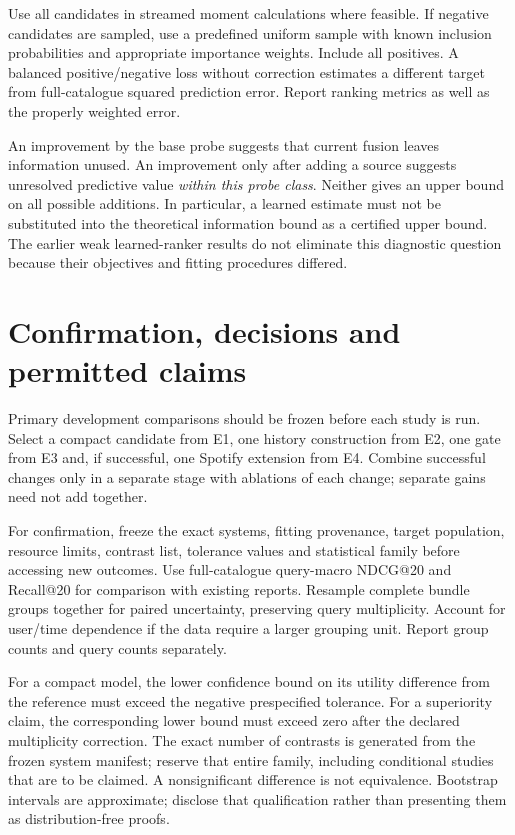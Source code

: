 \documentclass[11pt,a4paper]{article}
\begin{document}
Use all candidates in streamed moment calculations where feasible. If
negative candidates are sampled, use a predefined uniform sample with known
inclusion probabilities and appropriate importance weights. Include all
positives. A balanced positive/negative loss without correction estimates
a different target from full-catalogue squared prediction error. Report
ranking metrics as well as the properly weighted error.

An improvement by the base probe suggests that current fusion leaves
information unused. An improvement only after adding a source suggests
unresolved predictive value \emph{within this probe class}. Neither gives
an upper bound on all possible additions. In particular, a learned estimate
must not be substituted into the theoretical information bound as a certified
upper bound. The earlier weak learned-ranker results do not eliminate this
diagnostic question because their objectives and fitting procedures differed.

\section{Confirmation, decisions and permitted claims}
\label{sec:confirmation}

Primary development comparisons should be frozen before each study is
run. Select a compact candidate from E1, one history construction from E2,
one gate from E3 and, if successful, one Spotify extension from E4. Combine
successful changes only in a separate stage with ablations of each change;
separate gains need not add together.

For confirmation, freeze the exact systems, fitting provenance, target
population, resource limits, contrast list, tolerance values and statistical
family before accessing new outcomes. Use full-catalogue query-macro
NDCG@20 and Recall@20 for comparison with existing reports. Resample complete
bundle groups together for paired uncertainty, preserving query multiplicity.
Account for user/time dependence if the data require a larger grouping unit.
Report group counts and query counts separately.

For a compact model, the lower confidence bound on its utility difference
from the reference must exceed the negative prespecified tolerance. For a
superiority claim, the corresponding lower bound must exceed zero after
the declared multiplicity correction. The exact number of contrasts is
generated from the frozen system manifest; reserve that entire family,
including conditional studies that are to be claimed. A nonsignificant
difference is not equivalence. Bootstrap intervals are approximate; disclose
that qualification rather than presenting them as distribution-free proofs.
\end{document}
